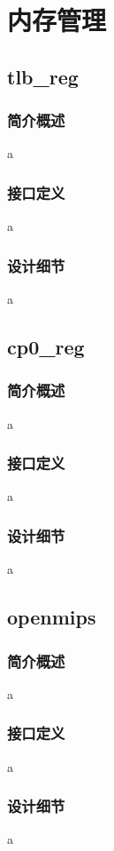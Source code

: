 \chapter{内存管理}

\section{tlb\_reg}

    \subsection{简介概述}
    a

    \subsection{接口定义}
    a

    \subsection{设计细节}
    a

\section{cp0\_reg}

    \subsection{简介概述}
    a

    \subsection{接口定义}
    a

    \subsection{设计细节}
    a

\section{openmips}

    \subsection{简介概述}
    a

    \subsection{接口定义}
    a

    \subsection{设计细节}
    a
